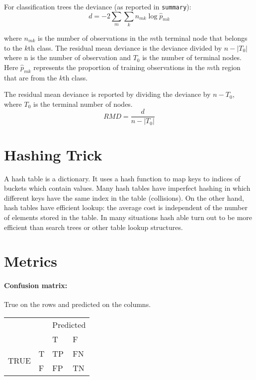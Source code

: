 \documentclass[12pt]{article}
\begin{document}
For classification trees the deviance (as reported in  \texttt{summary}):
\[
d = -2 \sum_m \sum_k n_{mk} \log \hat{p}_{mk}
\]

where $n_{mk}$ is the number of observations in the $m$th terminal node that belongs to the $k$th class. The residual mean deviance is the deviance divided by $n-|T_0|$ where n is the number of observation and $T_0$ is the number of terminal nodes. Here $\hat p_{mk}$ represents the proportion of training observations in the $m$th
region that are from the $k$th class.

The residual mean deviance is reported by dividing the deviance by $n - T_0$, where $T_0$ is the terminal number of nodes. 
\[
RMD = \frac{d}{n-|T_0|}
\]

\section{Hashing Trick}

A hash table is a dictionary. It uses a hash function to map keys to indices of buckets which contain values. Many hash tables have imperfect hashing  in which different keys have the same index in the table (collisions). On the other hand, hash tables have efficient lookup: the average cost is independent of the number of elements stored in the table. In many situations hash able turn out to be more efficient than search trees or other table lookup structures.  

\section{Metrics}

\paragraph{Confusion matrix: } True on the rows and predicted on the columns.

\begin{table}[h]
\centering
\begin{tabular}{ll|l|l|}
\cline{3-4}
                                            &   & \multicolumn{2}{l|}{Predicted} \\ \cline{3-4} 
                                            &   & T              & F             \\ \hline
\multicolumn{1}{|l|}{\multirow{2}{*}{TRUE}} & T & TP             & FN            \\ \cline{2-4} 
\multicolumn{1}{|l|}{}                      & F & FP             & TN            \\ \hline
\end{tabular}
\end{table}
\end{document}
